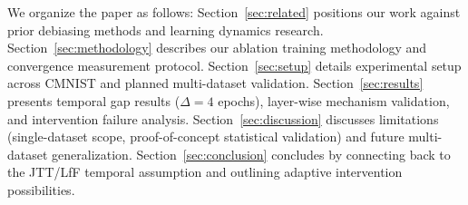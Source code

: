 We organize the paper as follows: Section~\ref{sec:related} positions our work against prior debiasing methods and learning dynamics research. Section~\ref{sec:methodology} describes our ablation training methodology and convergence measurement protocol. Section~\ref{sec:setup} details experimental setup across CMNIST and planned multi-dataset validation. Section~\ref{sec:results} presents temporal gap results ($\Delta=4$ epochs), layer-wise mechanism validation, and intervention failure analysis. Section~\ref{sec:discussion} discusses limitations (single-dataset scope, proof-of-concept statistical validation) and future multi-dataset generalization. Section~\ref{sec:conclusion} concludes by connecting back to the JTT/LfF temporal assumption and outlining adaptive intervention possibilities.
